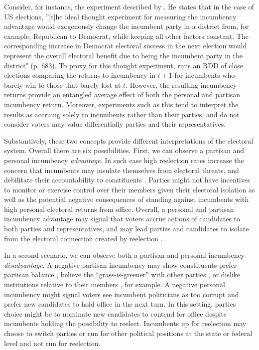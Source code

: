 \documentclass[12pt]{amsart}
\numberwithin{equation}{section}
\theoremstyle{definition}
\theoremstyle{definition}
\theoremstyle{definition}
\begin{document}
Consider, for instance, the experiment described by \citet{lee_2008}. He states that in the case of US elections, ''[t]he ideal thought experiment for measuring the incumbency advantage would exogenously change the incumbent party in a district from, for example, Republican to Democrat, while keeping all other factors constant. The corresponding increase in Democrat electoral success in the next election would represent the overall electoral benefit due to being the incumbent party in the district" (p. 683). To proxy for this thought experiment, \citet{lee_2008} runs an RDD of close elections comparing the returns to incumbency in $t+1$ for incumbents who barely win to those that barely lost at $t$. However, the resulting incumbency returns provide an entangled average effect of both the personal and partisan incumbency return. Moreover, experiments such as this tend to interpret the results as accruing solely to incumbents rather than their parties, and do not consider voters may value differentially parties and their representatives. 

Substantively, these two concepts provide different interpretations of the electoral system. Overall there are six possibilities. First, we can observe a  partisan and personal incumbency \emph{advantage}. In such case high reelection rates increase the concern that incumbents may insulate themselves from electoral threats, and debilitate their accountability to constituents \citep{ashworth_etal_2019, cox_katz_2002}. Parties might not have incentives to monitor or exercise control over their members given their electoral isolation as well as the potential negative consequences of standing against incumbents with high personal electoral returns from office. Overall, a personal and partisan incumbency advantage may signal that voters accrue actions of candidates to both parties and representatives, and may lead parties and candidates to isolate from the electoral connection created by reelection \citep{mayhew_1974}. 

 In a second scenario, we can observe both a partisan and personal incumbency \emph{disadvantage}. A negative partisan incumbency may show constituents prefer partisan balance \citep{folke_snyder_2012}, believe the ``grass-is-greener'' with other parties \citep{bhatia_turan_2013}, or dislike institutions relative to their members \citep{parker_davidson_1979}, for example. A negative personal incumbency might signal voters see incumbent politicians as too corrupt and prefer new candidates to hold office in the next turn. In this setting, parties choice might be to nominate new candidates to contend for office despite incumbents holding the possibility to reelect. Incumbents up for reelection may choose to switch parties or run for other political positions at the state or federal level and not run for reelection. 
  
\end{document}
